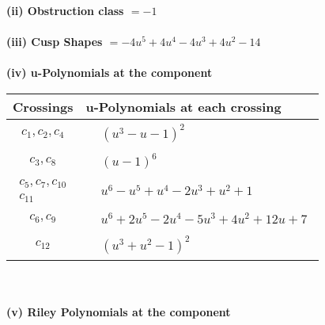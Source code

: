 \documentclass[1p]{elsarticle_modified}
\theoremstyle{definition}
\begin{document}
\flushleft \textbf{(ii) Obstruction class $= -1$}\\~\\
\flushleft \textbf{(iii) Cusp Shapes $= -4 u^5+4 u^4-4 u^3+4 u^2-14$}\\~\\
\newpage\renewcommand{\arraystretch}{1}
\flushleft \textbf{(iv) u-Polynomials at the component}\newline \\
\begin{tabular}{m{50pt}|m{274pt}}
Crossings & \hspace{64pt}u-Polynomials at each crossing \\
\hline $$\begin{aligned}c_{1},c_{2},c_{4}\end{aligned}$$&$\begin{aligned}
&(u^3- u-1)^2
\end{aligned}$\\
\hline $$\begin{aligned}c_{3},c_{8}\end{aligned}$$&$\begin{aligned}
&(u-1)^6
\end{aligned}$\\
\hline $$\begin{aligned}c_{5},c_{7},c_{10}\\c_{11}\end{aligned}$$&$\begin{aligned}
&u^6- u^5+u^4-2 u^3+u^2+1
\end{aligned}$\\
\hline $$\begin{aligned}c_{6},c_{9}\end{aligned}$$&$\begin{aligned}
&u^6+2 u^5-2 u^4-5 u^3+4 u^2+12 u+7
\end{aligned}$\\
\hline $$\begin{aligned}c_{12}\end{aligned}$$&$\begin{aligned}
&(u^3+u^2-1)^2
\end{aligned}$\\
\hline
\end{tabular}\\~\\
\newpage\renewcommand{\arraystretch}{1}
\flushleft \textbf{(v) Riley Polynomials at the component}\newline \\
\end{document}
